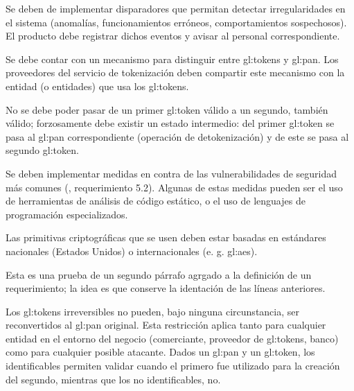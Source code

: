 {
  Se deben de implementar disparadores que permitan detectar
  irregularidades en el sistema (anomalías, funcionamientos erróneos,
  comportamientos sospechosos). El producto debe registrar dichos eventos y
  avisar al personal correspondiente.
}

{
  Se debe contar con un mecanismo para distinguir entre \glspl{gl:token}
  y \gls{gl:pan}. Los proveedores del servicio de tokenización deben
  compartir este mecanismo con la entidad (o entidades) que usa los
  \glspl{gl:token}.
}


{
  No se debe poder pasar de un primer \gls{gl:token} válido a un segundo,
  también válido; forzosamente debe existir un estado intermedio: del primer
  \gls{gl:token} se pasa al \gls{gl:pan} correspondiente (operación de
  detokenización) y de este se pasa al segundo \gls{gl:token}.
}

{
  Se deben implementar medidas en contra de las vulnerabilidades de
  seguridad más comunes (\cite{dss_pa}, requerimiento 5.2). Algunas de estas
  medidas pueden ser el uso de herramientas de análisis de código estático,
  o el uso de lenguajes de programación especializados.
}

{
  Las primitivas criptográficas que se usen deben estar basadas en
  estándares nacionales (Estados Unidos) o internacionales (e. g.
  \gls{gl:aes}).

  Esta es una prueba de un segundo párrafo agrgado a la definición de un requerimiento;
  la idea es que conserve la identación de las líneas anteriores.
}

Los \glspl{gl:token} irreversibles no pueden, bajo ninguna circunstancia, ser
reconvertidos al \gls{gl:pan} original. Esta restricción aplica tanto para
cualquier entidad en el entorno del negocio (comerciante, proveedor de
\glspl{gl:token}, banco) como para cualquier posible atacante. Dados un
\gls{gl:pan} y un \gls{gl:token}, los identificables permiten validar cuando el
primero fue utilizado para la creación del segundo, mientras que los no
identificables, no.

